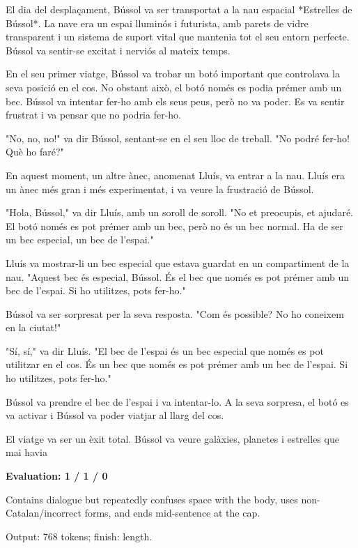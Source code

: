 \documentclass[10pt]{article}
\begin{document}
{\begin{minipage}{\textwidth}
\par\smallskip
El dia del desplaçament, Bússol va ser transportat a la nau espacial *Estrelles de Bússol*. La nave era un espai lluminós i futurista, amb parets de vidre transparent i un sistema de suport vital que mantenia tot el seu entorn perfecte. Bússol va sentir-se excitat i nerviós al mateix temps.
\par\smallskip
En el seu primer viatge, Bússol va trobar un botó important que controlava la seva posició en el cos. No obstant això, el botó només es podia prémer amb un bec. Bússol va intentar fer-ho amb els seus peus, però no va poder. Es va sentir frustrat i va pensar que no podria fer-ho.
\par\smallskip
"No, no, no!" va dir Bússol, sentant-se en el seu lloc de treball. "No podré fer-ho! Què ho faré?"
\par\smallskip
En aquest moment, un altre ànec, anomenat Lluís, va entrar a la nau. Lluís era un ànec més gran i més experimentat, i va veure la frustració de Bússol.
\par\smallskip
"Hola, Bússol," va dir Lluís, amb un soroll de soroll. "No et preocupis, et ajudaré. El botó només es pot prémer amb un bec, però no és un bec normal. Ha de ser un bec especial, un bec de l'espai."
\par\smallskip
Lluís va mostrar-li un bec especial que estava guardat en un compartiment de la nau. "Aquest bec és especial, Bússol. És el bec que només es pot prémer amb un bec de l'espai. Si ho utilitzes, pots fer-ho."
\par\smallskip
Bússol va ser sorpresat per la seva resposta. "Com és possible? No ho coneixem en la ciutat!"
\par\smallskip
"Sí, sí," va dir Lluís. "El bec de l'espai és un bec especial que només es pot utilitzar en el cos. És un bec que només es pot prémer amb un bec de l'espai. Si ho utilitzes, pots fer-ho."
\par\smallskip
Bússol va prendre el bec de l'espai i va intentar-lo. A la seva sorpresa, el botó es va activar i Bússol va poder viatjar al llarg del cos.
\par\smallskip
El viatge va ser un èxit total. Bússol va veure galàxies, planetes i estrelles que mai havia\par\smallskip
\textbf{Evaluation: 1 / 1 / 0}\par Contains dialogue but repeatedly confuses space with the body, uses non-Catalan/incorrect forms, and ends mid-sentence at the cap.
\par {\color{gray} Output: 768 tokens; finish: length.}\par

\end{minipage}}
\end{document}
